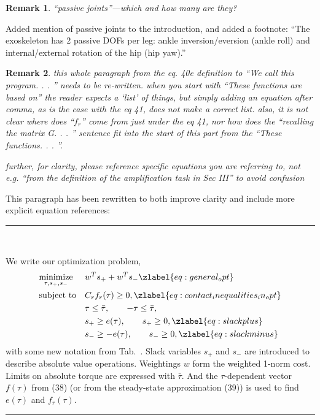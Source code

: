 \documentclass[10pt,letterpaper]{letter}
\makeatletter
\def\label#1{\@bsphack
	\protected@write\@auxout{}%
	{\string\newlabel{#1}{{\@currentlabel}{\thepage}}}%
	\@esphack}
\renewcommand*{\ref}[1]{\zref{#1}}
\renewcommand*{\label}[1]{\zlabel{#1}}
\newcommand*{\ta}[1]{\textcolor[HTML]{107f10}{#1}}
\newcounter{reviewer}
\newtheorem{rev}{Remark}[reviewer]
\newcommand{\reviewer}[1]{\begin{rev} #1\end{rev}}
\newcommand{\response}[1]{\par{\hfill\begin{minipage}{\dimexpr\textwidth-2cm} #1\end{minipage}}}
\newcommand{\paperquote}[1]{%
	\begin{center}
		
		\begin{minipage}{.8\textwidth}
			{\rule{\textwidth}{.5pt}}\vspace{.5em}\\
			\begin{minipage}{\textwidth}\setlength{\parindent}{2em}#1\end{minipage}
			\vspace{.5em}
			{\rule{\textwidth}{.5pt}}
		\end{minipage}%
	\end{center}
}
\makeatother
\begin{document}
\begin{letter}{}
\reviewer{``passive joints''---which and how many are they?}
\response{Added mention of passive joints to the introduction, and added a footnote: ``\ta{The exoskeleton has 2 passive DOFs per leg: ankle inversion/eversion (ankle roll) and internal/external rotation of the hip (hip yaw).}''}


\reviewer{this whole paragraph from the eq. 40e definition to ``We call this program. . . '' needs to be re-written. when you start with ``These functions are based on'' the reader expects a `list' of things, but simply adding an equation after comma, as is the case with the eq 41, does not make a correct list. also, it is not clear where does ``$f_r$'' come from just under the eq 41, nor how does the ``recalling the matrix G. . . '' sentence fit into the start of this part from the ``These functions. . . ''.
	
further, for clarity, please reference specific equations you are referring to, not e.g. ``from the definition of the amplification task in Sec III'' to avoid confusion}
\response{This paragraph has been rewritten to both improve clarity and include more explicit equation references:}
\paperquote{\setcounter{equation}{39}
\ta{We write our optimization problem,}
\begin{subequations}
	\begin{align}
	&\underset{\tau, s_+, s_-}{\mathrm{minimize}}
	&& w^T s_+ +  w^T s_- \label{eq:general_opt}\\
	&\text{subject to}
	&&C_r f_r(\tau) \geq 0,\label{eq:contact_inequalities_in_opt}\\
	&&& \tau \leq \bar{\tau},\qquad -\tau \leq \bar{\tau},\\
	&&& s_+ \geq e(\tau), \qquad s_+\geq 0,\label{eq:slackplus}\\
	&&& s_- \geq -e(\tau), \qquad s_-\geq 0,\label{eq:slackminus}\end{align}
\end{subequations}
\ta{with some new notation from Tab.~\ref{tab:not4}. Slack variables $s_+$ and $s_-$ are introduced to describe absolute value operations. Weightings $w$ form the weighted 1-norm cost. Limits on absolute torque are expressed with $\bar\tau$. And the $\tau$-dependent vector $f(\tau)$ from (38) (or from the steady-state approximation (39)) is used to find $e(\tau)$ and $f_r(\tau)$.}

}
\end{letter}
\end{document}
